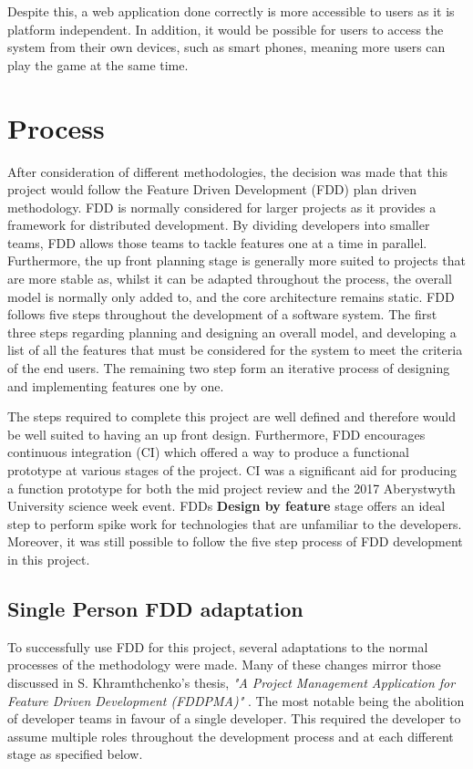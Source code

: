 Despite this, a web application done correctly is more accessible to users as it is platform independent. In addition, it would be possible for users to access the system from their own devices, such as smart phones, meaning more users can play the game at the same time.

\section{Process}
After consideration of different methodologies, the decision was made that this project would follow the Feature Driven Development (FDD) plan driven methodology. FDD is normally considered for larger projects as it provides a framework for distributed development. By dividing developers into smaller teams, FDD allows those teams to tackle features one at a time in parallel. Furthermore, the up front planning stage is generally more suited to projects that are more stable as, whilst it can be adapted throughout the process, the overall model is normally only added to, and the core architecture remains static. FDD follows five steps throughout the development of a software system. The first three steps regarding planning and designing an overall model, and developing a list of all the features that must be considered for the system to meet the criteria of the end users. The remaining two step form an iterative process of designing and implementing features one by one.

The steps required to complete this project are well defined and therefore would be well suited to having an up front design. Furthermore, FDD encourages continuous integration (CI) which offered a way to produce a functional prototype at various stages of the project. CI was a significant aid for producing a function prototype for both the mid project review and the 2017 Aberystwyth University science week event. FDDs \textbf{Design by feature} stage offers an ideal step to perform spike work for technologies that are unfamiliar to the developers. Moreover, it was still possible to follow the five step process of FDD development in this project.

\subsection{Single Person FDD adaptation}
To successfully use FDD for this project, several adaptations to the normal processes of the methodology were made. Many of these changes mirror those discussed in S. Khramthchenko's thesis, \textit{"A Project Management Application for Feature Driven Development (FDDPMA)"} \cite{single_person_fdd}. The most notable being the abolition of developer teams in favour of a single developer. This required the developer to assume multiple roles throughout the development process and at each different stage as specified below.

